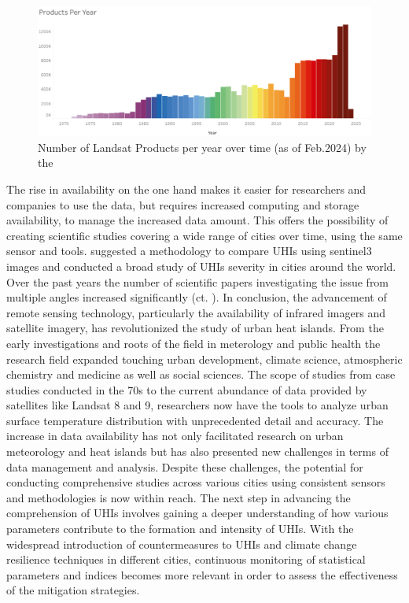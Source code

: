 \documentclass[12pt,a4paper, english,twoside]{article}
\begin{document}
  \begin{figure}[!htbp]
    \centering
    \includegraphics[width=\textwidth]{img/LandsatDataArchiveStatsProductsPerYear.png}
    \caption{Number of Landsat Products per year over time (as of Feb.2024) by the~\cite{landsatstats}\label{fig:landsatproductsovertime}}
  \end{figure}
  The rise in availability on the one hand makes it easier for researchers and companies to use the data, but requires increased computing and storage availability, to manage the increased data amount.
  This offers the possibility of creating scientific studies covering a wide range of cities over time, using the same sensor and tools. 
  \Cite{Sobrino2020} suggested a methodology to compare \glspl{UHI} using \gls{sentinel3} images and conducted a broad study of \glspl{UHI} severity in cities around the world. 
  Over the past years the number of scientific papers investigating the issue from multiple angles increased significantly (ct. \cite[P. 3]{Piracha2022b}).
  In conclusion, the advancement of remote sensing technology, particularly the availability of infrared imagers and satellite imagery, has revolutionized the study of urban heat islands. 
  From the early investigations and roots of the field in meterology and public health the research field expanded touching urban development, climate science, atmospheric chemistry and medicine as well as social sciences.
  The scope of studies from case studies conducted in the 70s to the current abundance of data provided by satellites like Landsat 8 and 9, researchers now have the tools to analyze urban surface temperature distribution with unprecedented detail and accuracy.
  The increase in data availability has not only facilitated research on urban meteorology and heat islands but has also presented new challenges in terms of data management and analysis.
  Despite these challenges, the potential for conducting comprehensive studies across various cities using consistent sensors and methodologies is now within reach.
  The next step in advancing the comprehension of \glspl{UHI} involves gaining a deeper understanding of how various parameters contribute to the formation and intensity of \glspl{UHI}.
  With the widespread introduction of countermeasures to \glspl{UHI} and climate change resilience techniques in different cities, continuous monitoring of statistical parameters and indices becomes more relevant in order to assess the effectiveness of the mitigation strategies. 
\end{document}
